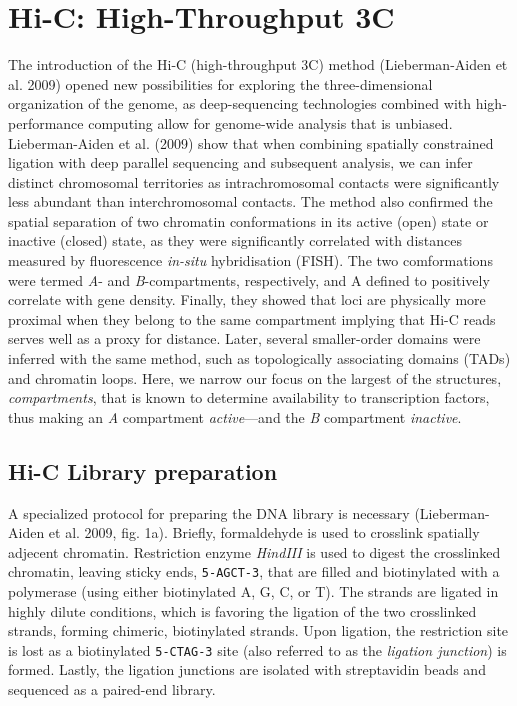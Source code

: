 \documentclass[
  11pt,
  a4paper,
]{scrbook}
\let\oldemph\emph
\renewcommand\emph[1]{\oldemph{\color{gray}#1}}
\begin{document}
\section{Hi-C: High-Throughput 3C}\label{hi-c-high-throughput-3c}

The introduction of the Hi-C (high-throughput 3C) method
(Lieberman-Aiden et al. 2009) opened new possibilities for exploring the
three-dimensional organization of the genome, as deep-sequencing
technologies combined with high-performance computing allow for
genome-wide analysis that is unbiased. Lieberman-Aiden et al. (2009)
show that when combining spatially constrained ligation with deep
parallel sequencing and subsequent analysis, we can infer distinct
chromosomal territories as intrachromosomal contacts were significantly
less abundant than interchromosomal contacts. The method also confirmed
the spatial separation of two chromatin conformations in its active
(open) state or inactive (closed) state, as they were significantly
correlated with distances measured by fluorescence \emph{in-situ}
hybridisation (FISH). The two comformations were termed \emph{A}- and
\emph{B}-compartments, respectively, and A defined to positively
correlate with gene density. Finally, they showed that loci are
physically more proximal when they belong to the same compartment
implying that Hi-C reads serves well as a proxy for distance. Later,
several smaller-order domains were inferred with the same method, such
as topologically associating domains (TADs) and chromatin loops. Here,
we narrow our focus on the largest of the structures,
\emph{compartments}, that is known to determine availability to
transcription factors, thus making an \emph{A} compartment
\emph{active}---and the \emph{B} compartment \emph{inactive}.

\subsection{Hi-C Library preparation}\label{hi-c-library-preparation}

A specialized protocol for preparing the DNA library is necessary
(Lieberman-Aiden et al. 2009, fig. 1a). Briefly, formaldehyde is used to
crosslink spatially adjecent chromatin. Restriction enzyme
\emph{HindIII} is used to digest the crosslinked chromatin, leaving
sticky ends, \texttt{5-AGCT-3}, that are filled and biotinylated with a
polymerase (using either biotinylated A, G, C, or T). The strands are
ligated in highly dilute conditions, which is favoring the ligation of
the two crosslinked strands, forming chimeric, biotinylated strands.
Upon ligation, the restriction site is lost as a biotinylated
\texttt{5-CTAG-3} site (also referred to as the \emph{ligation
junction}) is formed. Lastly, the ligation junctions are isolated with
streptavidin beads and sequenced as a paired-end library.
\end{document}
